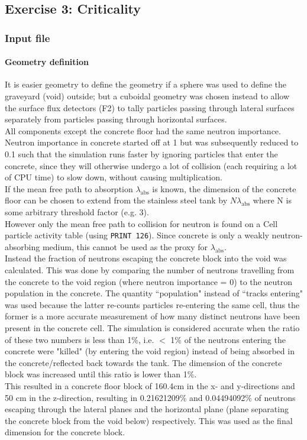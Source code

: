 \documentclass[a4paper, 12pt]{article}
\begin{document}
\subsection{Exercise 3: Criticality}
\subsubsection{Input file}
\paragraph{Geometry definition}
It is easier geometry to define the geometry if a sphere was used to define the graveyard (void) outside; but a cuboidal geometry was chosen instead to allow the surface flux detectors (F2) to tally particles passing through lateral surfaces separately from particles passing through horizontal surfaces.
\\All components except the concrete floor had the same neutron importance. Neutron importance in concrete started off at 1 but was subsequently reduced to 0.1 such that the simulation runs faster by ignoring particles that enter the concrete, since they will otherwise undergo a lot of collision (each requiring a lot of CPU time) to slow down, without causing multiplication.
\\If the mean free path to absorption $\lambda_{\text{abs}}$ is known, the dimension of the concrete floor can be chosen to extend from the stainless steel tank by $N\lambda_{\text{abs}}$ where N is some arbitrary threshold factor (e.g. 3).
\\However only the mean free path to collision for neutron is found on a Cell particle activity table (using \texttt{PRINT 126}). Since concrete is only a weakly neutron-absorbing medium, this cannot be used as the proxy for $\lambda_{\text{abs}}$.
\\Instead the fraction of neutrons escaping the concrete block into the void was calculated. This was done by comparing the number of neutrons travelling from the concrete to the void region (where neutron importance = 0) to the neutron population in the concrete. The quantity ``population" instead of ``tracks entering" was used because the latter re-counts particles re-entering the same cell, thus the former is a more accurate measurement of how many distinct neutrons have been present in the concrete cell. The simulation is considered accurate when the ratio of these two numbers is less than 1\%, i.e. $<$ 1\% of the neutrons entering the concrete were "killed" (by entering the void region) instead of being absorbed in the concrete/reflected back towards the tank. The dimension of the concrete block was increased until this ratio is lower than 1\%.
\\This resulted in a concrete floor block of 160.4cm in the x- and y-directions and 50 cm in the z-direction, resulting in 0.21621209\%  and 0.04494092\% of neutrons escaping through the lateral planes and the horizontal plane (plane separating the concrete block from the void below) respectively. This was used as the final dimension for the concrete block.
\end{document}
